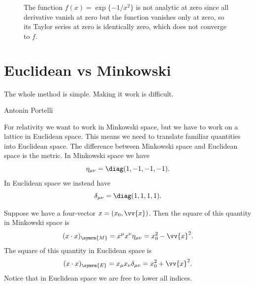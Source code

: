 \documentclass[fleqn]{NotesClass}
\newcommand{\minkowskiMetric}{\eta}
\newcommand{\minkowski}{\symrm{M}}
\newcommand{\euclidean}{\symrm{E}}
\begin{document}
    \begin{figure}
        \caption{The function \(f(x) = \exp\{-1/x^2\}\) is not analytic at zero since all derivative vanish at zero but the function vanishes only at zero, so its Taylor series at zero is identically zero, which does not converge to \(f\).}
        \label{fig:exp-1/x^2}
    \end{figure}
    
    \section{Euclidean vs Minkowski}
    \epigraph{The whole method is simple. Making it work is difficult.}{Antonin Portelli}
    For relativity we want to work in Minkowski space, but we have to work on a lattice in Euclidean space.
    This means we need to translate familiar quantities into Euclidean space.
    The difference between Minkowski space and Euclidean space is the metric.
    In Minkowski space we have
    \begin{equation}
        \minkowskiMetric_{\mu\nu} = \diag(1, -1, -1, -1).
    \end{equation}
    In Euclidean space we instead have
    \begin{equation}
        \delta_{\mu\nu} = \diag(1, 1, 1, 1).
    \end{equation}
    
    Suppose we have a four-vector \(x = (x_0, \vv{x})\).
    Then the square of this quantity in Minkowski space is
    \begin{equation}
        (x \cdot x)_{\minkowski} = x^\mu x^\nu \minkowskiMetric_{\mu\nu} = x_0^2 - \vv{x}^2.
    \end{equation}
    The square of this quantity in Euclidean space is
    \begin{equation}
        (x \cdot x)_{\euclidean} = x_\mu x_\nu \delta_{\mu\nu} = x_0^2 + \vv{x}^2.
    \end{equation}
    Notice that in Euclidean space we are free to lower all indices.
    
\end{document}
